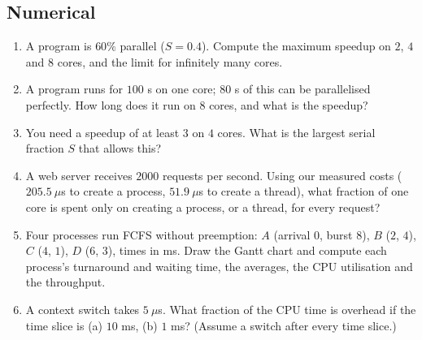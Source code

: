 \documentclass[11pt,a4paper]{article}
\begin{document}
\subsection*{Numerical}
\begin{enumerate}[leftmargin=1.6em,resume]
  \item A program is $60\%$ parallel ($S = 0.4$). Compute the maximum speedup on $2$, $4$ and $8$ cores, and the limit for infinitely many cores.
  \item A program runs for $100$ s on one core; $80$ s of this can be parallelised perfectly. How long does it run on $8$ cores, and what is the speedup?
  \item You need a speedup of at least $3$ on $4$ cores. What is the largest serial fraction $S$ that allows this?
  \item A web server receives $2000$ requests per second. Using our measured costs ($205.5\ \mu$s to create a process, $51.9\ \mu$s to create a thread), what fraction of one core is spent only on creating a process, or a thread, for every request?
  \item Four processes run FCFS without preemption: $A$ (arrival $0$, burst $8$), $B$ ($2$, $4$), $C$ ($4$, $1$), $D$ ($6$, $3$), times in ms. Draw the Gantt chart and compute each process's turnaround and waiting time, the averages, the CPU utilisation and the throughput.
  \item A context switch takes $5\ \mu$s. What fraction of the CPU time is overhead if the time slice is (a) $10$ ms, (b) $1$ ms? (Assume a switch after every time slice.)
\end{enumerate}
\end{document}
